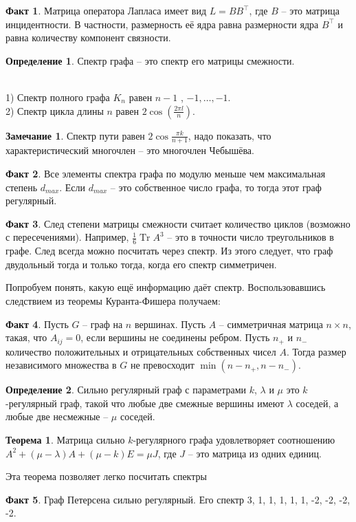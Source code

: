 \documentclass[10pt,a4paper,oneside]{book}
\theoremstyle{definition}
\newtheorem*{rem}{Замечание}
\newtheorem{defn}{Определение}
\newtheorem*{fact}{Факт}
\newtheorem{thm}{Теорема}
\newcommand{\Tr}{\operatorname{Tr}}
\def\exm{\noindent {\bf Примеры:}}
\def\thrm{\begin{thm}}
\def\ethrm{\end{thm}}
\def\dfn{\begin{defn}}
\def\edfn{\end{defn}}
\def\rm{\begin{rem}}
\def\erm{\end{rem}}
\def\fct{\begin{fact}}
\def\efct{\end{fact}}
\begin{document}
\fct Матрица оператора Лапласа имеет вид $L=BB^{\top}$, где $B$ -- это матрица инцидентности. В частности, размерность её ядра равна размерности ядра $B^{\top}$ и равна количеству компонент связности.
\efct

\dfn Спектр графа -- это спектр его матрицы смежности.
\edfn

\exm \\
1) Спектр полного графа $K_n$ равен $n-1$ , $-1, \dots,-1$.\\
2) Спектр цикла длины $n$ равен $2\cos(\frac{2\pi l}{n})$.\\


\rm Спектр пути равен $2\cos \frac{\pi k}{n+1}$, надо показать, что характеристический многочлен -- это многочлен Чебышёва.
\erm

\fct Все элементы спектра графа по модулю меньше чем максимальная степень $d_{max}$. Если $d_{max}$ -- это собственное число графа, то тогда этот граф регулярный.
\efct

\fct  След степени матрицы смежности считает количество циклов (возможно с пересечениями). Например, $\frac{1}{6}\Tr A^3$ -- это в точности число треугольников в графе. След всегда можно посчитать  через спектр. Из этого следует, что граф двудольный тогда и только тогда, когда его спектр симметричен. 
\efct 





Попробуем понять, какую ещё информацию даёт спектр. Воспользовавшись следствием из теоремы Куранта-Фишера получаем:

\fct Пусть $G$ -- граф на $n$ вершинах. Пусть $A$ -- симметричная матрица $n\times n$, такая, что $A_{ij}= 0$, если вершины не соединены ребром. Пусть $n_{+}$ и $n_{-}$ количество положительных и отрицательных собственных чисел $A$. Тогда размер независимого множества в $G$ не превосходит $\min(n-n_{+},n-n_{-})$.
\efct

\dfn Сильно регулярный граф с параметрами $k$, $\lambda$ и $\mu$ это $k$-регулярный граф, такой что любые две смежные вершины имеют $\lambda$ соседей, а любые две несмежные -- $\mu$ соседей.
\edfn

\thrm Матрица сильно $k$-регулярного графа удовлетворяет соотношению $A^2+(\mu-\lambda)A + (\mu-k)E=\mu J$, где $J$ -- это матрица из одних единиц.
\ethrm

Эта теорема позволяет легко посчитать спектры 
\fct 
 Граф Петерсена сильно регулярный. Его спектр 3, 1, 1, 1, 1, 1, -2, -2, -2, -2.
\efct
\end{document}
